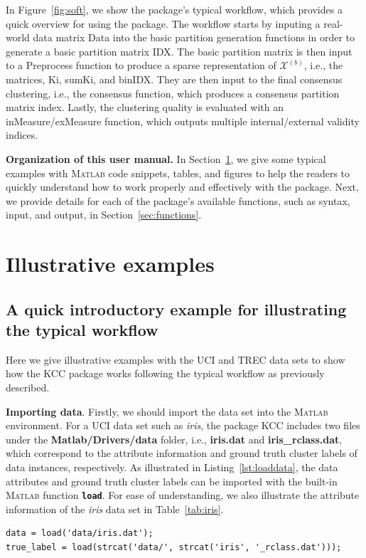 \documentclass[10pt]{acmtrans2e}
\newcommand{\Matlab}{\textsc{Matlab}}
\newcommand{\package}[1]{\textsf{#1}\xspace} %
\newcommand{\function}[1]{\textbf{\texttt{#1}}}
\begin{document}
In Figure~\ref{fig:soft}, we show the package's typical workflow, which provides a quick overview for using the package. The workflow starts by inputing a real-world data matrix \textsf{Data} into the basic partition generation functions in order to generate a basic partition matrix \textsf{IDX}. The basic partition matrix is then input to a \textsf{Preprocess} function to produce a sparse representation of $\mathcal{X}^{(b)}$, i.e., the matrices, \textsf{Ki}, \textsf{sumKi}, and \textsf{binIDX}. They are then input to the final consensus clustering, i.e., the consensus function, which produces a consensus partition matrix \textsf{index}. Lastly, the clustering quality is evaluated with an \textsf{inMeasure}/\textsf{exMeasure} function, which outputs multiple internal/external validity indices.

\textbf{Organization of this user manual.} In Section~\ref{sec:examples}, we give some typical examples with \Matlab{} code snippets, tables, and figures to help the readers to quickly understand how to work properly and effectively with the package. Next, we provide details for each of the package's available functions, such as syntax, input, and output, in Section~\ref{sec:functions}.

\section{Illustrative examples}\label{sec:examples}
\subsection{A quick introductory example for illustrating the typical workflow} \label{subsec:illexam}
Here we give illustrative examples with the UCI and TREC data sets to show how the \package{KCC} package works following the typical workflow as previously described.

\textbf{Importing data}. Firstly, we should import the data set into the \Matlab{} environment. For a UCI data set such as \textit{iris}, the package \package{KCC} includes two files under the \textbf{Matlab/Drivers/data} folder, i.e., \textbf{iris.dat} and \textbf{iris\_rclass.dat}, which correspond to the attribute information and ground truth cluster labels of data instances, respectively. As illustrated in Listing~\ref{lst:loaddata}, the data attributes and ground truth cluster labels can be imported with the built-in \Matlab{} function \function{load}. For ease of understanding, we also illustrate the attribute information of the \textit{iris} data set in Table~\ref{tab:iris}.
\begin{lstlisting}[caption={Using \function{load} to import data attributes and ground truth cluster labels.},label=lst:loaddata]
data = load('data/iris.dat');
true_label = load(strcat('data/', strcat('iris', '_rclass.dat')));
\end{lstlisting}
\end{document}
